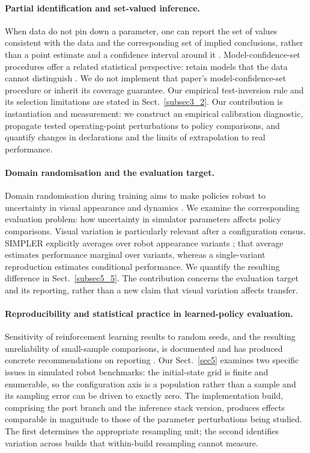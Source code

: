 \documentclass[pdflatex,iicol,sn-apa]{sn-jnl}
\theoremstyle{remark}
\begin{document}
\paragraph{Partial identification and set-valued inference.}
When data do not pin down a parameter, one can report the set of values consistent with the data and
the corresponding set of implied conclusions, rather than a point estimate and a confidence interval
around it \citep{manski2003partial, tamer2010partial}. Model-confidence-set procedures offer a related statistical perspective: retain models that the data cannot distinguish \citep{hansen2011model}. We do not implement that paper's model-confidence-set procedure or inherit its coverage guarantee. Our empirical test-inversion rule and its selection limitations are stated in Sect.~\ref{subsec3_2}. Our
contribution is instantiation and measurement: we construct an empirical calibration diagnostic,
propagate tested operating-point perturbations to policy comparisons, and quantify changes in
declarations and the limits of extrapolation to real performance.

\paragraph{Domain randomisation and the evaluation target.}
Domain randomisation during training aims to make policies robust to uncertainty in visual
appearance \citep{tobin2017domain} and dynamics \citep{peng2018sim}. We examine the corresponding
evaluation problem: how uncertainty in simulator parameters affects policy comparisons.
Visual variation is particularly relevant after a configuration census. SIMPLER explicitly averages
over robot appearance variants \citep{li2024simpler}; that average estimates performance marginal
over variants, whereas a single-variant reproduction estimates conditional performance. We quantify
the resulting difference in Sect.~\ref{subsec5_5}. The contribution concerns the evaluation target
and its reporting, rather than a new claim that visual variation affects transfer.

\paragraph{Reproducibility and statistical practice in learned-policy evaluation.}
Sensitivity of reinforcement learning results to random seeds, and the resulting unreliability of
small-sample comparisons, is documented and has produced concrete recommendations on reporting
\citep{henderson2018deep, agarwal2021deep, colas2018how}. Our Sect.~\ref{sec5} examines two specific issues in simulated robot benchmarks: the initial-state grid is finite and
enumerable, so the configuration axis is a population rather than a sample and its sampling error
can be driven to exactly zero. The implementation build, comprising the port branch and the
inference stack version, produces effects comparable in magnitude to those of the parameter
perturbations being studied. The first determines the appropriate resampling unit; the second identifies variation across builds that within-build resampling cannot measure.
\end{document}
